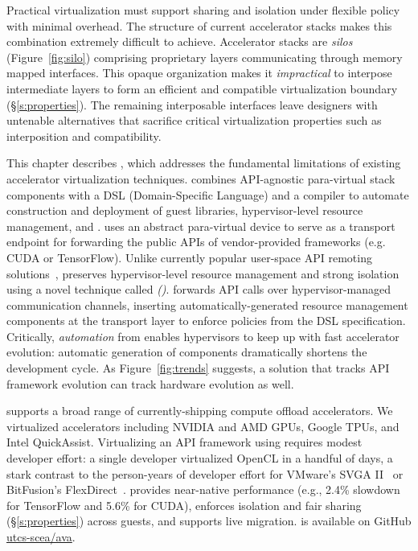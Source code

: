 Practical virtualization must support sharing and isolation under flexible
policy with minimal overhead. The structure of current accelerator stacks
makes this combination extremely difficult to achieve.
Accelerator stacks are \emph{silos} (Figure~\ref{fig:silo}) comprising
proprietary layers communicating through memory mapped interfaces.
This opaque organization makes it \emph{impractical} to interpose intermediate
layers to form an efficient and compatible virtualization boundary
(\S\ref{s:properties}).
The remaining interposable interfaces leave designers with untenable
alternatives that sacrifice critical virtualization properties such as
interposition and compatibility.

This chapter describes \Model, which addresses the fundamental limitations of
existing accelerator virtualization techniques.
\Model combines API-agnostic para-virtual stack components with a DSL
(Domain-Specific Language) and a compiler to automate construction and
deployment of guest libraries, hypervisor-level resource management, and
\workers. \Model uses an abstract para-virtual device to serve as a transport
endpoint for forwarding the public APIs of vendor-provided frameworks
(e.g. CUDA or TensorFlow). Unlike currently popular user-space API remoting
solutions~\cite{bitfusion,xaas,vmCUDA,rCUDA,cu2rcu}, \model preserves hypervisor-level resource management and strong isolation using a novel
technique called \emph{\noveltechnique (\novtechabbrv)}.
\novtechabbrv forwards API calls over hypervisor-managed communication
channels, inserting au\-to\-ma\-tically-generated resource management
components at the transport layer to enforce policies from the DSL
specification. Critically, \emph{automation} from \Model enables hypervisors
to keep up with fast accelerator evolution: automatic generation of components
dramatically shortens the development cycle. As Figure~\ref{fig:trends}
suggests, a solution that tracks API framework evolution can track hardware
evolution as well.

\Model supports a broad range of currently-shipping compute offload
accelerators. We virtualized \numaccelerators accelerators including NVIDIA
and AMD GPUs, Google TPUs, and Intel QuickAssist. Virtualizing an API
framework using \model requires modest developer effort: a single developer
virtualized OpenCL in a handful of days, a stark contrast to the person-years
of developer effort for VMware's SVGA II~\cite{dowty2009gpu} or BitFusion's
FlexDirect~\cite{bitfusion}. \Model provides near-native performance
(e.g., 2.4\% slowdown for TensorFlow and 5.6\% for CUDA), enforces isolation
and fair sharing (\S\ref{s:properties}) across guests, and supports live
migration. \Model is available on GitHub \mbox{\href{https://github.com/utcs-scea/ava}{utcs-scea/ava}}.

